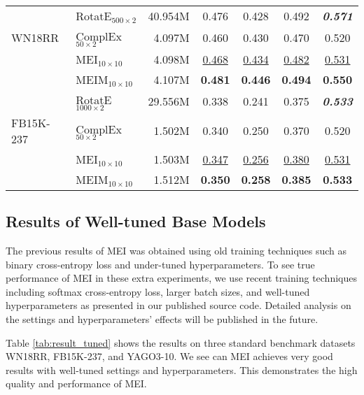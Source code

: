 \documentclass{ecai}
\theoremstyle{plain}  \newtheorem{thm}{Theorem}  \newtheorem{lem}[thm]{Lemma}  \newtheorem{prop}[thm]{Proposition}
\theoremstyle{remark}  \newtheorem*{rem}{Remark}
\begin{document}
\begin{table}
\begin{center}
\begin{adjustbox}{max width=\columnwidth}
\begin{tabular}{@{\extracolsep{-3.5pt}}llrcccc}
				
				& RotatE$ _{500 \times 2} $ & 40.954M & 0.476 & 0.428 & 0.492 & \textit{\textbf{0.571}} \\ \cmidrule{3-7}
				\multirow{1}{*}{WN18RR} & ComplEx$ _{50 \times 2} $ & 4.097M & 0.460 & 0.430 & 0.470 & 0.520 \\
				
				& MEI$ _{10 \times 10} $ & 4.098M & \underline{0.468} & \underline{0.434} & \underline{0.482} & \underline{0.531} \\ & MEIM$ _{10 \times 10} $ & 4.107M & \textbf{0.481} & \textbf{0.446} & \textbf{0.494} & \textbf{0.550} \\ \midrule
				\midrule
				
				
				& RotatE$ _{1000 \times 2} $ & 29.556M & 0.338 & 0.241 & 0.375 & \textit{\textbf{0.533}} \\ \cmidrule{3-7}
				\multirow{1}{*}{FB15K-237} & ComplEx$ _{50 \times 2} $ & 1.502M & 0.340 & 0.250 & 0.370 & 0.520 \\
				
				& MEI$ _{10 \times 10} $ & 1.503M & \underline{0.347} & \underline{0.256} & \underline{0.380} & \underline{0.531} \\ & MEIM$ _{10 \times 10} $ & 1.512M & \textbf{0.350} & \textbf{0.258} & \textbf{0.385} & \textbf{0.533} \\ 

				\bottomrule
			\end{tabular}
		\end{adjustbox}
	\end{center}
\end{table}

\vfill\break  

\subsection{Results of Well-tuned Base Models}
The previous results of MEI was obtained using old training techniques such as binary cross-entropy loss and under-tuned hyperparameters. To see true performance of MEI in these extra experiments, we use recent training techniques including softmax cross-entropy loss, larger batch sizes, and well-tuned hyperparameters as presented in our published source code. Detailed analysis on the settings and hyperparameters' effects will be published in the future. 

Table \ref{tab:result_tuned} shows the results on three standard benchmark datasets WN18RR, FB15K-237, and YAGO3-10. We see can MEI achieves very good results with well-tuned settings and hyperparameters. This demonstrates the high quality and performance of MEI.
\end{document}
